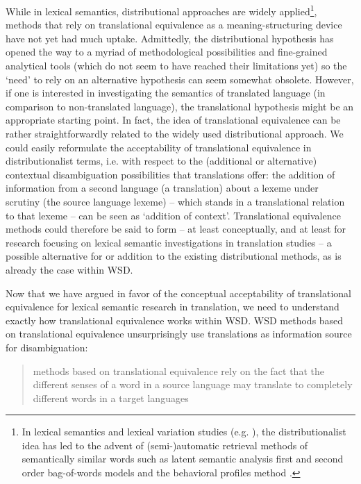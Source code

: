 While in lexical semantics, distributional approaches are widely applied\footnote{In lexical semantics and lexical variation studies (e.g. \citealt{peirsman_automatic_2010}), the distributionalist idea has led to the advent of (semi-)automatic retrieval methods of semantically similar words such as latent semantic analysis \citep{landauer_solution_1997} first and second order bag-of-words models \citealt{manning_foundations_1999} and the behavioral profiles method \citealt{divjak_ways_2006, evans_behavioral_2009}.}, methods that rely on translational equivalence as a meaning-structuring device have not yet had much uptake. Admittedly, the distributional hypothesis has opened the way to a myriad of methodological possibilities and fine-grained analytical tools (which do not seem to have reached their limitations yet) so the ‘need’ to rely on an alternative hypothesis can seem somewhat obsolete. However, if one is interested in investigating the semantics of translated language (in comparison to non-translated language), the translational hypothesis might be an appropriate starting point. In fact, the idea of translational equivalence can be rather straightforwardly related to the widely used distributional approach. We could easily reformulate the acceptability of translational equivalence in distributionalist terms, i.e. with respect to the (additional or alternative) contextual disambiguation possibilities that translations offer: the addition of information from a second language (a translation) about a lexeme under scrutiny (the source language lexeme) – which stands in a translational relation to that lexeme – can be seen as ‘addition of context’. Translational equivalence methods could therefore be said to form – at least conceptually, and at least for research focusing on lexical semantic investigations in translation studies – a possible alternative for or addition to the existing distributional methods, as is already the case within WSD.

Now that we have argued in favor of the conceptual acceptability of translational equivalence for lexical semantic research in translation, we need to understand exactly how translational equivalence works within WSD. WSD methods based on translational equivalence unsurprisingly use translations as information source for disambiguation:

\begin{quote}
methods based on translational equivalence rely on the fact that the different senses of a word in a source language may translate to completely different words in a target languages \citep[134]{agirre_unsupervised_2007}
\end{quote}

